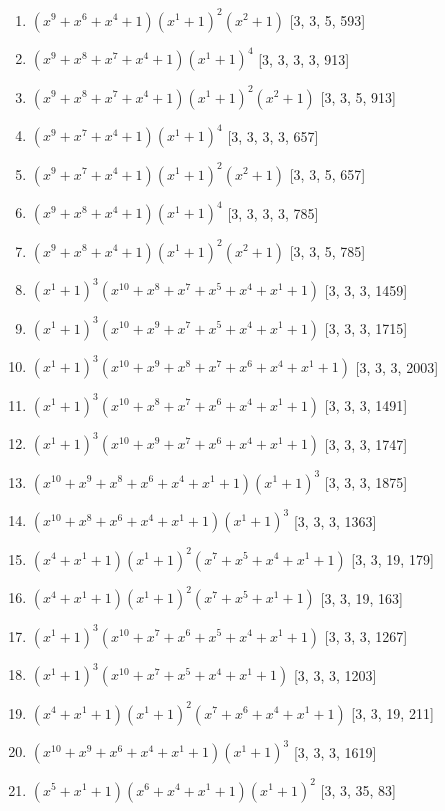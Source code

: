 \documentclass[10pt,twocolumn]{article}
\begin{document}
\begin{enumerate}
\item $(x^{9} + x^{6} + x^{4} + 1)(x^{1} + 1)^{2}(x^{2} + 1)$  [3, 3, 5, 593]
\item $(x^{9} + x^{8} + x^{7} + x^{4} + 1)(x^{1} + 1)^{4}$  [3, 3, 3, 3, 913]
\item $(x^{9} + x^{8} + x^{7} + x^{4} + 1)(x^{1} + 1)^{2}(x^{2} + 1)$  [3, 3, 5, 913]
\item $(x^{9} + x^{7} + x^{4} + 1)(x^{1} + 1)^{4}$  [3, 3, 3, 3, 657]
\item $(x^{9} + x^{7} + x^{4} + 1)(x^{1} + 1)^{2}(x^{2} + 1)$  [3, 3, 5, 657]
\item $(x^{9} + x^{8} + x^{4} + 1)(x^{1} + 1)^{4}$  [3, 3, 3, 3, 785]
\item $(x^{9} + x^{8} + x^{4} + 1)(x^{1} + 1)^{2}(x^{2} + 1)$  [3, 3, 5, 785]
\item $(x^{1} + 1)^{3}(x^{10} + x^{8} + x^{7} + x^{5} + x^{4} + x^{1} + 1)$  [3, 3, 3, 1459]
\item $(x^{1} + 1)^{3}(x^{10} + x^{9} + x^{7} + x^{5} + x^{4} + x^{1} + 1)$  [3, 3, 3, 1715]
\item $(x^{1} + 1)^{3}(x^{10} + x^{9} + x^{8} + x^{7} + x^{6} + x^{4} + x^{1} + 1)$  [3, 3, 3, 2003]
\item $(x^{1} + 1)^{3}(x^{10} + x^{8} + x^{7} + x^{6} + x^{4} + x^{1} + 1)$  [3, 3, 3, 1491]
\item $(x^{1} + 1)^{3}(x^{10} + x^{9} + x^{7} + x^{6} + x^{4} + x^{1} + 1)$  [3, 3, 3, 1747]
\item $(x^{10} + x^{9} + x^{8} + x^{6} + x^{4} + x^{1} + 1)(x^{1} + 1)^{3}$  [3, 3, 3, 1875]
\item $(x^{10} + x^{8} + x^{6} + x^{4} + x^{1} + 1)(x^{1} + 1)^{3}$  [3, 3, 3, 1363]
\item $(x^{4} + x^{1} + 1)(x^{1} + 1)^{2}(x^{7} + x^{5} + x^{4} + x^{1} + 1)$  [3, 3, 19, 179]
\item $(x^{4} + x^{1} + 1)(x^{1} + 1)^{2}(x^{7} + x^{5} + x^{1} + 1)$  [3, 3, 19, 163]
\item $(x^{1} + 1)^{3}(x^{10} + x^{7} + x^{6} + x^{5} + x^{4} + x^{1} + 1)$  [3, 3, 3, 1267]
\item $(x^{1} + 1)^{3}(x^{10} + x^{7} + x^{5} + x^{4} + x^{1} + 1)$  [3, 3, 3, 1203]
\item $(x^{4} + x^{1} + 1)(x^{1} + 1)^{2}(x^{7} + x^{6} + x^{4} + x^{1} + 1)$  [3, 3, 19, 211]
\item $(x^{10} + x^{9} + x^{6} + x^{4} + x^{1} + 1)(x^{1} + 1)^{3}$  [3, 3, 3, 1619]
\item $(x^{5} + x^{1} + 1)(x^{6} + x^{4} + x^{1} + 1)(x^{1} + 1)^{2}$  [3, 3, 35, 83]

\end{enumerate}
\end{document}
